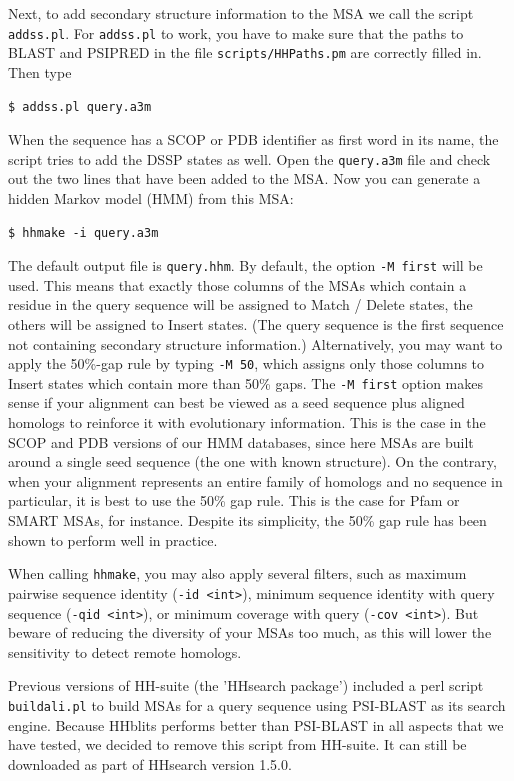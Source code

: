 \documentclass[11pt,a4paper]{article}
\begin{document}
Next, to add secondary structure information to the MSA we call the script \verb`addss.pl`. For \verb`addss.pl` to work, you have to make sure that the paths to BLAST and PSIPRED in the file \verb`scripts/HHPaths.pm` are correctly filled in. Then type
\begin{verbatim}
$ addss.pl query.a3m
\end{verbatim}
When the sequence has a SCOP or PDB identifier as first word in its name, the script tries to add the DSSP states as well. Open the \verb`query.a3m` file and check out the two lines that have been added to the MSA. Now you can generate a hidden Markov model (HMM) from this MSA:
\begin{verbatim}
$ hhmake -i query.a3m
\end{verbatim}
The default output file is \verb`query.hhm`. By default, the option \verb`-M first` will 
be used. This means that exactly those columns of 
the MSAs which contain a residue in the query sequence will be assigned to Match 
/ Delete states, the others will be assigned to Insert states. (The query sequence is 
the first sequence not containing secondary structure information.) Alternatively, you 
may want to apply the 50\%-gap rule by typing \verb`-M 50`, which assigns only those columns 
to Insert states which contain more than 50\% gaps. The \verb`-M first` option makes sense 
if your alignment can best be viewed as a seed sequence plus aligned homologs to 
reinforce it with evolutionary information. This is the case in the SCOP and PDB 
versions of our HMM databases, since here MSAs are built around a single seed 
sequence (the one with known structure). On the contrary, when your alignment 
represents an entire family of homologs and no sequence in particular, it is best to 
use the 50\% gap rule. This is the case for Pfam or SMART MSAs, for instance. 
Despite its simplicity, the 50\% gap rule has been shown to perform well in practice.

When calling \verb`hhmake`, you may also apply several filters, such as maximum pairwise 
sequence identity (\verb`-id <int>`), minimum sequence identity with query sequence 
(\verb`-qid <int>`), or minimum coverage with query (\verb`-cov <int>`). But beware 
of reducing the diversity of your MSAs too much, as this will lower the sensitivity to
detect remote homologs.

Previous versions of HH-suite (the 'HHsearch package') included a perl script \verb`buildali.pl` to build MSAs for a query sequence using PSI-BLAST as its search engine. Because HHblits performs better than PSI-BLAST in all aspects that we have tested, we decided to remove this script from HH-suite. It can still be downloaded as part of HHsearch version 1.5.0.
\end{document}
